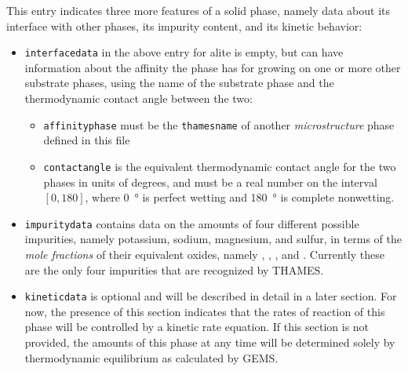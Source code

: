 \documentclass{article}
\newcommand{\us}{\underline{\phantom{X}}}
\begin{document}
{\normalsize{ }
This entry indicates three more features of a solid phase, namely
data about its interface with other phases, its impurity content,
and its kinetic behavior:
\begin{itemize}
	\item \texttt{interface{\us}data} in the above entry for alite
	      is empty, but can have information about the affinity the
	      phase has for growing on one or more other substrate phases, using
	      the name of the substrate phase and the thermodynamic contact
	      angle between the two:
	      \begin{itemize}
		      \item \verb!affinityphase! must be the \verb!thamesname! of
		            another \textit{microstructure} phase defined in this file
		      \item \verb!contactangle! is the equivalent thermodynamic
		            contact angle for the two phases in units of degrees,
		            and must be a real number on the interval $\left[0,180\right]$,
		            where \qty{0}{\degree} is perfect wetting and
		            \qty{180}{\degree} is complete nonwetting.
	      \end{itemize}
	\item \texttt{impurity{\us}data} contains data on the amounts
	      of four different possible impurities, namely
	      potassium, sodium, magnesium, and sulfur, in terms
	      of the \textit{mole fractions} of their equivalent oxides,
	      namely , , , and .
	      Currently these are the only four impurities that
	      are recognized by THAMES.
	\item \texttt{kinetic{\us}data} is optional and will be described
	      in detail in a later section. For now, the presence of this
	      section indicates that the rates of reaction of this phase
	      will be controlled by a kinetic rate equation. If this
	      section is not provided, the amounts of this phase at any
	      time will be determined solely by thermodynamic equilibrium
	      as calculated by GEMS.
\end{itemize}

}
\end{document}
